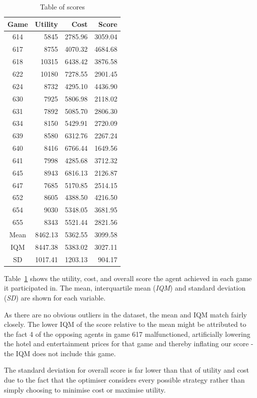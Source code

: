 \documentclass[a4paper]{proc}
\begin{document}
\begin{table}
  \caption{Table of scores}
  \label{tab:scores}
  \center
  \begin{tabular}{ c | r r r }
    Game & Utility & Cost    & Score   \\
    \hline
    614  & 5845    & 2785.96 & 3059.04 \\
    617  & 8755    & 4070.32 & 4684.68 \\
    618  & 10315   & 6438.42 & 3876.58 \\
    622  & 10180   & 7278.55 & 2901.45 \\
    624  & 8732    & 4295.10 & 4436.90 \\
    630  & 7925    & 5806.98 & 2118.02 \\
    631  & 7892    & 5085.70 & 2806.30 \\
    634  & 8150    & 5429.91 & 2720.09 \\
    639  & 8580    & 6312.76 & 2267.24 \\
    640  & 8416    & 6766.44 & 1649.56 \\
    641  & 7998    & 4285.68 & 3712.32 \\
    645  & 8943    & 6816.13 & 2126.87 \\
    647  & 7685    & 5170.85 & 2514.15 \\
    652  & 8605    & 4388.50 & 4216.50 \\
    654  & 9030    & 5348.05 & 3681.95 \\
    655  & 8343    & 5521.44 & 2821.56 \\
    \hline
    Mean & 8462.13 & 5362.55 & 3099.58 \\
    IQM  & 8447.38 & 5383.02 & 3027.11 \\
    SD   & 1017.41 & 1203.13 &  904.17 \\
  \end{tabular}
\end{table}

Table~\ref{tab:scores} shows the utility, cost, and overall score the agent achieved in each game it participated in. The mean, interquartile mean (\emph{IQM}) and standard deviation (\emph{SD}) are shown for each variable.

As there are no obvious outliers in the dataset, the mean and IQM match fairly closely. The lower IQM of the score relative to the mean might be attributed to the fact 4 of the opposing agents in game 617 malfunctioned, artificially lowering the hotel and entertainment prices for that game and thereby inflating our score - the IQM does not include this game.

The standard deviation for overall score is far lower than that of utility and cost due to the fact that the optimiser considers every possible strategy rather than simply choosing to minimise cost or maximise utility.

\printbibliography
\end{document}
